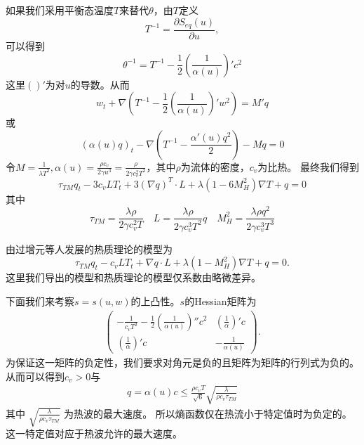 \documentclass{article}
\begin{document}
如果我们采用平衡态温度$T$来替代$\theta$，由$T$定义
\begin{equation*}
	T^{-1}=\frac{\partial S_{eq}(u)}{\partial u},
\end{equation*}
可以得到
\begin{equation}
\theta^{-1}=T^{-1}-\frac{1}{2}(\frac{1}{\alpha(u)})'{c}^2
\end{equation}
这里$()'$为对$u$的导数。从而
\begin{equation*}
{w}_t+\nabla(T^{-1}-\frac{1}{2}(\frac{1}{\alpha(u)})' {w}^2)=M'{q}
\end{equation*}
或
\begin{equation*}
({\alpha(u)}{{q}})_t-\nabla(T^{-1}- \frac{\alpha'(u){q}^2}{2})-M{q}=0
\end{equation*}
令$M=\frac{1}{\lambda T^2}, \alpha(u)=\frac{\rho c_v}{2\gamma u^3}=\frac{\rho}{2\gamma c_v^2 T^3}$，其中$\rho$为流体的密度，$c_v$为比热。
最终我们得到
\begin{equation}
\tau_{TM} {q}_t-3c_v {L}T_t+3(\nabla {q})^T \cdot {L}+\lambda(1-6M_H^2)\nabla T+{q}=0
\end{equation}
其中
\begin{equation*}
\tau_{TM}=\frac{\lambda \rho}{2 \gamma c_v^2 T} \quad {L}=\frac{\lambda \rho}{2 \gamma c_v^3 T^2}{q} \quad M_H^2=\frac{\lambda \rho {q}^2}{2\gamma c_v^3 T^3}
\end{equation*}

由过增元等人发展的热质理论的模型为\cite{}
\begin{equation}
\tau_{TM} {q}_t-c_v {L}T_t+\nabla {q} \cdot {L}+\lambda(1-M_H^2)\nabla T+{q}=0.
\end{equation}
这里我们导出的模型和热质理论的模型仅系数由略微差异。

下面我们来考察$s=s(u,w)$的上凸性。$s$的Hessian矩阵为
\begin{eqnarray*}
\left( \begin{array}{ll} -\frac{1}{c_v T^2}-\frac{1}{2}(\frac{1}{\alpha(u)})'' {c}^2 & (\frac{1}{\alpha})'{c} \\ (\frac{1}{\alpha})'{c} & -\frac{1}{\alpha(u)} \end{array} \right).
\end{eqnarray*}
为保证这一矩阵的负定性，我们要求对角元是负的且矩阵为矩阵的行列式为负的。从而可以得到$c_v >0$与
\begin{eqnarray*}
{q}=\alpha(u){c} \le \frac{\rho c_v T}{\sqrt{6}} \sqrt{\frac{\lambda}{\rho c_v \tau_{TM}}}
\end{eqnarray*}
其中 $\sqrt{\frac{\lambda}{\rho c_v \tau_{TM}}}$ 为热波的最大速度\cite{Jou1996extended}。 所以熵函数仅在热流小于特定值时为负定的。这一特定值对应于热波允许的最大速度。
\end{document}
